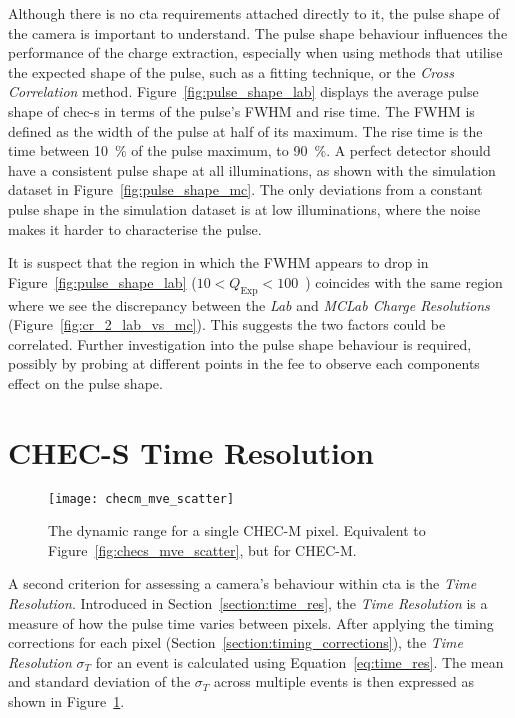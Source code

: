Although there is no \gls{cta} requirements attached directly to it, the pulse shape of the camera is important to understand. The pulse shape behaviour influences the performance of the charge extraction, especially when using methods that utilise the expected shape of the pulse, such as a fitting technique, or the \textit{Cross Correlation} method. Figure~\ref{fig:pulse_shape_lab} displays the average pulse shape of \gls{chec-s} in terms of the pulse's FWHM and rise time. The FWHM is defined as the width of the pulse at half of its maximum. The rise time is the time between \SI{10}{\percent} of the pulse maximum, to \SI{90}{\percent}. A perfect detector should have a consistent pulse shape at all illuminations, as shown with the simulation dataset in Figure~\ref{fig:pulse_shape_mc}. The only deviations from a constant pulse shape in the simulation dataset is at low illuminations, where the noise makes it harder to characterise the pulse. 

It is suspect that the region in which the FWHM appears to drop in Figure~\ref{fig:pulse_shape_lab} ($10 < Q_\text{Exp} < 100$~\si{\pe}) coincides with the same region where we see the discrepancy between the \textit{Lab} and \textit{MCLab Charge Resolutions} (Figure~\ref{fig:cr_2_lab_vs_mc}). This suggests the two factors could be correlated. Further investigation into the pulse shape behaviour is required, possibly by probing at different points in the \gls{fee} to observe each components effect on the pulse shape. 

\section{CHEC-S Time Resolution}

\begin{figure}
	\centering
    \texttt{[image: checm\_mve\_scatter]} 
	\caption[CHEC-M average measured charge versus average expected charge.]{The dynamic range for a single CHEC-M pixel. Equivalent to Figure~\ref{fig:checs_mve_scatter}, but for CHEC-M.}
	\label{fig:checm_mve_scatter}
\end{figure}

A second criterion for assessing a camera's behaviour within \gls{cta} is the \textit{Time Resolution}. Introduced in Section~\ref{section:time_res}, the \textit{Time Resolution} is a measure of how the pulse time varies between pixels. After applying the timing corrections for each pixel (Section~\ref{section:timing_corrections}), the \textit{Time Resolution} $\sigma_T$ for an event is calculated using Equation~\ref{eq:time_res}. The mean and standard deviation of the $\sigma_T$ across multiple events is then expressed as shown in Figure~\ref{}.


